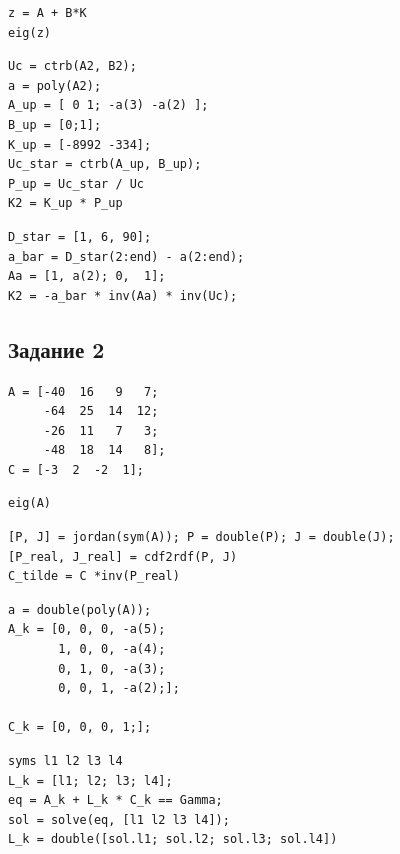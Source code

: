 \documentclass[a4paper,12pt]{article}
\begin{document}
\begin{lstlisting}[caption={Собственные числа матрицы замкнутой системы}, label={lst:eig1}]
z = A + B*K
eig(z)
\end{lstlisting}

\begin{lstlisting}[caption={Расчет матрицы \(P_\text{упр}\)}, label={lst:P1}]
Uc = ctrb(A2, B2);
a = poly(A2);
A_up = [ 0 1; -a(3) -a(2) ];
B_up = [0;1];
K_up = [-8992 -334];
Uc_star = ctrb(A_up, B_up);
P_up = Uc_star / Uc
K2 = K_up * P_up
\end{lstlisting}

\begin{lstlisting}[caption={Расчет \(\hat K_c\) методом Басса-Гура\(/\)Акакермана}, label={lst:bassa}]
D_star = [1, 6, 90];   
a_bar = D_star(2:end) - a(2:end);  
Aa = [1, a(2); 0,  1];  
K2 = -a_bar * inv(Aa) * inv(Uc);
\end{lstlisting}

\newpage
\subsection*{Задание 2}

\begin{lstlisting}[caption={Инициализация}]
A = [-40  16   9   7;
	 -64  25  14  12;
	 -26  11   7   3;
	 -48  18  14   8];
C = [-3  2  -2  1];
\end{lstlisting}

\begin{lstlisting}[caption={Собственные числа матрицы системы}, label={lst:eig2}]
eig(A)
\end{lstlisting}

\begin{lstlisting}[caption={Поиск вещественной Жордановой формы}, label={lst:jordan2}]
[P, J] = jordan(sym(A)); P = double(P); J = double(J);
[P_real, J_real] = cdf2rdf(P, J)
C_tilde = C *inv(P_real)
\end{lstlisting}

\begin{lstlisting}[caption={Каноническая форма системы}, label={lst:kanon2}]
a = double(poly(A));
A_k = [0, 0, 0, -a(5);
	   1, 0, 0, -a(4);
	   0, 1, 0, -a(3);
	   0, 0, 1, -a(2);];

C_k = [0, 0, 0, 1;];
\end{lstlisting}

\begin{lstlisting}[caption={Синтез матрицы $L_k$}, label={lst:lk}]
syms l1 l2 l3 l4
L_k = [l1; l2; l3; l4];
eq = A_k + L_k * C_k == Gamma;
sol = solve(eq, [l1 l2 l3 l4]);
L_k = double([sol.l1; sol.l2; sol.l3; sol.l4])
\end{lstlisting}
\end{document}
